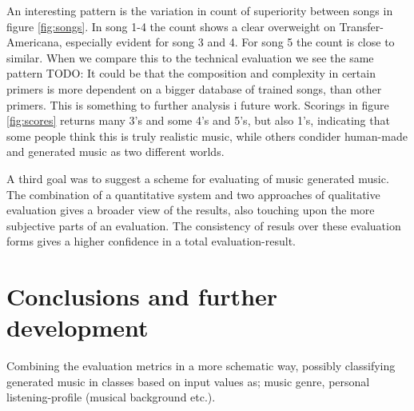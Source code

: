 \documentclass{IEEEtran}
\begin{document}
    An interesting pattern is the variation in count of superiority between songs in figure \ref{fig:songs}. In song 1-4 the count shows a clear overweight on Transfer-Americana, especially evident for song 3 and 4. For song 5 the count is close to similar. When we compare this to the technical evaluation we see the same pattern TODO: It could be that the composition and complexity in certain primers is more dependent on a bigger database of trained songs, than other primers. This is something to further analysis i future work. Scorings in figure \ref{fig:scores} returns many 3's and some 4's and 5's, but also 1's, indicating that some people think this is truly realistic music, while others condider human-made and generated music as two different worlds.

    A third goal was to suggest a scheme for evaluating of music generated music. The combination of a quantitative system and two approaches of qualitative evaluation gives a broader view of the results, also touching upon the more subjective parts of an evaluation. The consistency of resuls over these evaluation forms gives a higher confidence in a total evaluation-result.

    
    \section{Conclusions and further development}
    Combining the evaluation metrics in a more schematic way, possibly classifying generated music in classes based on input values as; music genre, personal listening-profile (musical background etc.). 

    \vfill
    \pagebreak
    \printbibliography
\end{document}

